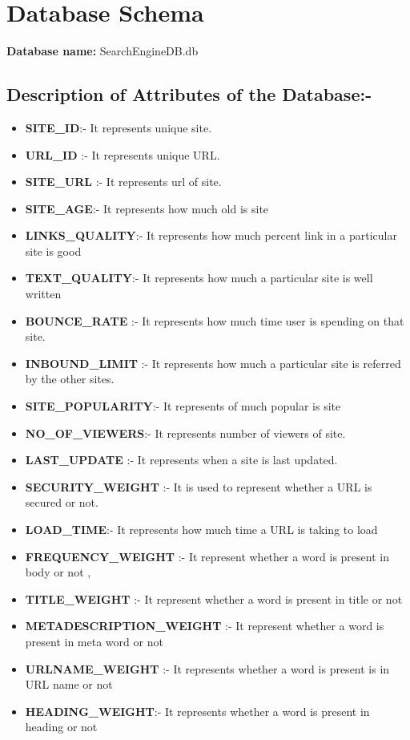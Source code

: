 \documentclass{scrreprt}
\begin{document}
\chapter{Database Schema}

\textbf{Database name:} SearchEngineDB.db

\section{Description of  Attributes of the Database:-}

 \begin{itemize}
\item \textbf {SITE_ID}:- It represents unique site.
\item \textbf {URL_ID} :-  It represents unique URL.
\item \textbf {SITE_URL} :- It represents url of site.
\item \textbf {SITE_AGE}:- It represents how much old is site
\item \textbf {LINKS_QUALITY}:-  It represents how much percent  link in a particular site is good
\item \textbf {TEXT_QUALITY}:- It represents how much a particular site is well written
\item \textbf {BOUNCE_RATE}  :- It represents  how much time user is spending on that site.
\item \textbf {INBOUND_LIMIT} :- It represents how much a particular site is referred by the other sites.         
\item \textbf {SITE_POPULARITY}:- It represents of much popular is site
\item \textbf {NO_OF_VIEWERS}:- It represents number of viewers of site. 
\item \textbf {LAST_UPDATE}	:- It represents when a site is last updated.        
\item \textbf {SECURITY_WEIGHT} :- It is used to represent whether a URL is secured or not.      
\item \textbf {LOAD_TIME}:-   It represents how much time a URL is taking to load
\item \textbf {FREQUENCY_WEIGHT} :- It represent whether a word is present  in body or not	 	,
\item \textbf {TITLE_WEIGHT}  :-  It represent whether a word is present in title or not	 	
\item \textbf {METADESCRIPTION_WEIGHT} :- It represent whether a word is present in meta word or not
\item \textbf {URLNAME_WEIGHT} :- It represents whether a word is present is in URL name or not
\item \textbf {HEADING_WEIGHT}:- It represents whether a word is present in heading or not
\end{itemize}
\end{document}
